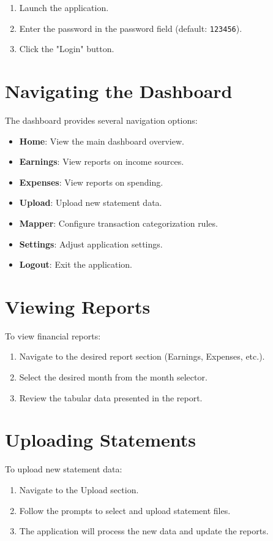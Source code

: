 \documentclass[11pt,a4paper]{report}
\begin{document}
\begin{enumerate}
    \item Launch the application.
    \item Enter the password in the password field (default: \texttt{123456}).
    \item Click the "Login" button.
\end{enumerate}

\section{Navigating the Dashboard}
The dashboard provides several navigation options:

\begin{itemize}
    \item \textbf{Home}: View the main dashboard overview.
    \item \textbf{Earnings}: View reports on income sources.
    \item \textbf{Expenses}: View reports on spending.
    \item \textbf{Upload}: Upload new statement data.
    \item \textbf{Mapper}: Configure transaction categorization rules.
    \item \textbf{Settings}: Adjust application settings.
    \item \textbf{Logout}: Exit the application.
\end{itemize}

\section{Viewing Reports}
To view financial reports:

\begin{enumerate}
    \item Navigate to the desired report section (Earnings, Expenses, etc.).
    \item Select the desired month from the month selector.
    \item Review the tabular data presented in the report.
\end{enumerate}

\section{Uploading Statements}
To upload new statement data:

\begin{enumerate}
    \item Navigate to the Upload section.
    \item Follow the prompts to select and upload statement files.
    \item The application will process the new data and update the reports.
\end{enumerate}
\end{document}
